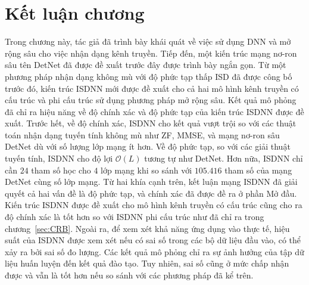 \section{Kết luận chương}

Trong chương này, tác giả đã trình bày khái quát về việc sử dụng DNN và mở rộng sâu cho việc nhận dạng kênh truyền. Tiếp đến, một kiến trúc mạng nơ-ron sâu tên DetNet đã được đề xuất trước đây được trình bày ngắn gọn. Từ một phương pháp nhận dạng không mù với độ phức tạp thấp ISD đã được công bố trước đó, kiến trúc ISDNN mới được đề xuất cho cả hai mô hình kênh truyền có cấu trúc và phi cấu trúc sử dụng phương pháp mở rộng sâu. Kết quả mô phỏng đã chỉ ra hiệu năng về độ chính xác và độ phức tạp của kiến trúc ISDNN được đề xuất. Trước hết, về độ chính xác, ISDNN cho kết quả vượt trội so với các thuật toán nhận dạng tuyến tính không mù như ZF, MMSE, và mạng nơ-ron sâu DetNet dù với số lượng lớp mạng ít hơn. Về độ phức tạp, so với các giải thuật tuyến tính, ISDNN cho độ lợi $\mathcal{O}(L)$ tương tự như DetNet. Hơn nữa, ISDNN chỉ cần $24$ tham số học cho $4$ lớp mạng khi so sánh với $105.416$ tham số của mạng DetNet cùng số lớp mạng. Từ hai khía cạnh trên, kết luận mạng ISDNN đã giải quyết cả hai vấn đề là độ phức tạp, và chính xác đã được đề ra ở phần Mở đầu. Kiến trúc ISDNN được đề xuất cho mô hình kênh truyền có cấu trúc cũng cho ra độ chính xác là tốt hơn so với ISDNN phi cấu trúc như đã chỉ ra trong chương~\ref{sec:CRB}.
Ngoài ra, để xem xét khả năng ứng dụng vào thực tế, hiệu suất của ISDNN được xem xét nếu có sai số trong các bộ dữ liệu đầu vào, có thể xảy ra bởi sai số đo lượng. Các kết quả mô phỏng chỉ ra sự ảnh hưởng của tập dữ liệu huấn luyện đến kết quả đào tạo. Tuy nhiên, sai số cũng ở mức chấp nhận được và vẫn là tốt hơn nếu so sánh với các phương pháp đã kể trên. 